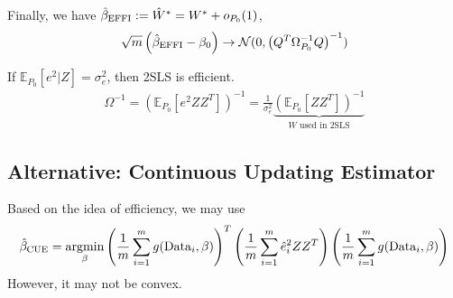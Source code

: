 \documentclass[11pt]{elegantbook}
\newcommand{\argmin}{\operatornamewithlimits{argmin}}
\begin{document}
Finally, we have $\hat{\beta}_\textnormal{EFFI}:=\hat{W}^*=W^*+o_{P_0}(1)$,
\begin{equation}
    \begin{aligned}
        \sqrt{m}\left(\hat{\beta}_\textnormal{EFFI}-\beta_0\right) \rightarrow \mathcal{N}(0,\left(Q^T\Omega_{P_0}^{-1}Q\right)^{-1})
    \end{aligned}
    \nonumber
\end{equation}

\begin{remark}
    If $\mathbb{E}_{P_0}[e^2|Z]=\sigma^2_e$, then 2SLS is efficient.
    \begin{equation}
        \begin{aligned}
            \Omega^{-1}=\left(\mathbb{E}_{P_0}[e^2ZZ^T]\right)^{-1}=\frac{1}{\sigma^2_e}\underbrace{\left(\mathbb{E}_{P_0}[ZZ^T]\right)^{-1}}_{W\text{ used in 2SLS}}
        \end{aligned}
        \nonumber
    \end{equation}
\end{remark}


\subsection{Alternative: Continuous Updating Estimator}
Based on the idea of efficiency, we may use
\begin{equation}
    \begin{aligned}
        \hat{\beta}_\textnormal{CUE}=\argmin_{\beta}\left(\frac{1}{m}\sum_{i=1}^m g(\textnormal{Data}_i,\beta)\right)^T\left(\frac{1}{m}\sum_{i=1}^m\hat{e}_i^2ZZ^T\right)\left(\frac{1}{m}\sum_{i=1}^m g(\textnormal{Data}_i,\beta)\right)
    \end{aligned}
    \nonumber
\end{equation}
However, it may not be convex.
\end{document}
